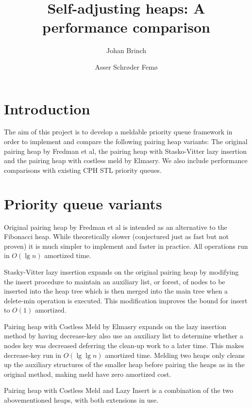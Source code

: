\documentclass{DIKU-article}[2010/01/13]
\title{Self-adjusting heaps: A performance comparison}
\author{
Johan Brinch
\and
Asser Schrøder Femø
}
\institute{
Department of Computing, University of Copenhagen\\
Universitetsparken 1, DK-2100 Copenhagen East, Denmark\\
\email{...@diku.dk}
\and
\email{asser@diku.dk}
}
\begin{document}
\maketitle

\begin{abstract}
\end{abstract}

\begin{subject}
\end{subject}

\section{Introduction}

The aim of this project is to develop a meldable priority queue framework in
order to implement and compare the following pairing heap variants: The original
pairing heap by Fredman et al, the pairing heap with Stasko-Vitter lazy insertion and
the pairing heap with costless meld by Elmasry. We also include performance
comparisons with existing CPH STL priority queues.

\section{Priority queue variants}

\begin{description}
\item{Original pairing heap} by Fredman et al\cite{fredman} is intended as an
alternative to the Fibonacci heap. While theoretically slower (conjectured just
as fast but not proven) it is much simpler to implement and faster in practice.
All operations run in $O(\lg n)$ amortized time.

\item{Stasky-Vitter lazy insertion} expands on the original pairing heap by
modifying the insert procedure to maintain an auxiliary list, or forest, of
nodes to be inserted into the heap tree which is then merged into the main tree
when a delete-min operation is executed. This modification improves the bound
for insert to $O(1)$ amortized.

\item{Pairing heap with Costless Meld} by Elmasry\cite{costlessmeld} expands on
the lazy insertion method by having decrease-key also use an auxiliary list to
determine whether a nodes key was decreased deferring the clean-up work to a
later time. This makes decrease-key run in $O(\lg \lg n)$ amortized time.
Melding two heaps only cleans up the auxiliary structures of the smaller heap
before pairing the heaps as in the original method, making meld have zero
amortized cost.

\item{Pairing heap with Costless Meld and Lazy Insert} is a combination of the
two abovementioned heaps, with both extensions in use.
\end{description}
\end{document}
